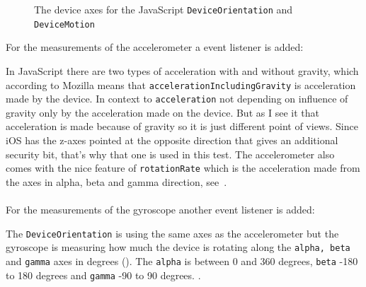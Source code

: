 \begin{figure}[H]
\begin{minipage}[c]{.23\textwidth}
    \hspace{1cm}
  \end{minipage}
  \caption{The device axes for the JavaScript \texttt{DeviceOrientation} and \texttt{DeviceMotion}}
  \label{fig:device-axes}
\end{figure}

For the measurements of the accelerometer a event listener is added:

In JavaScript there are two types of acceleration with and without gravity, which according to Mozilla means that \texttt{accelerationIncludingGravity} is acceleration made by the device. In context to \texttt{acceleration} not depending on influence of gravity only by the acceleration made on the device. But as I see it that acceleration is made because of gravity so it is just different point of views. Since iOS has the z-axes pointed at the opposite direction that gives an additional security bit, that's why that one is used in this test. The accelerometer also comes with the nice feature of \texttt{rotationRate} which is the acceleration made from the axes in alpha, beta and gamma direction, see~. \cite[]{sensor:accIncludingGravity} \\
\\
For the measurements of the gyroscope another event listener is added:

The \texttt{DeviceOrientation} is using the same axes as the accelerometer but the gyroscope is measuring how much the device is rotating along the \texttt{alpha, beta} and \texttt{gamma} axes in degrees (). The \texttt{alpha} is between 0 and 360 degrees, \texttt{beta} -180 to 180 degrees and \texttt{gamma} -90 to 90 degrees. \citet{sensor:DeviceOrientation:spec}.

